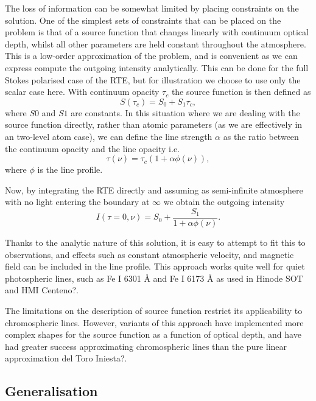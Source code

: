 The loss of information can be somewhat limited by placing constraints on the solution. One of the simplest sets of constraints that can be placed on the problem is that of a source function that changes linearly with continuum optical depth, whilst all other parameters are held constant throughout the atmosphere.
This is a low-order approximation of the problem, and is convenient as we can express compute the outgoing intensity analytically.
This can be done for the full Stokes polarised case of the RTE, but for illustration we choose to use only the scalar case here.
With continuum opacity $\tau_c$ the source function is then defined as
\begin{equation}
    S(\tau_c) = S_0 + S_1 \tau_c,
\end{equation}
where $S0$ and $S1$ are constants.
In this situation where we are dealing with the source function directly, rather than atomic parameters (as we are effectively in an two-level atom case), we can define the line strength $\alpha$ as the ratio between the continuum opacity and the line opacity i.e.
\begin{equation}
    \tau(\nu) = \tau_c (1 + \alpha \phi(\nu)),
\end{equation}
where $\phi$ is the line profile.

Now, by integrating the RTE directly and assuming as semi-infinite atmosphere with no light entering the boundary at $\infty$ we obtain the outgoing intensity
\begin{equation}
I(\tau=0, \nu) = S_0 + \frac{S_1}{1 + \alpha\phi(\nu)}.
\end{equation}

Thanks to the analytic nature of this solution, it is easy to attempt to fit this to observations, and effects such as constant atmospheric velocity, and magnetic field can be included in the line profile.
This approach works quite well for quiet photospheric lines, such as Fe I 6301 \AA{} and Fe I 6173 \AA{} as used in Hinode SOT and HMI \NeedRef{} Centeno?.

The limitations on the description of source function restrict its applicability to chromospheric lines.
However, variants of this approach have implemented more complex shapes for the source function as a function of optical depth, and have had greater success approximating chromospheric lines than the pure linear approximation \NeedRef{} del Toro Iniesta?.

\subsection{Generalisation}

